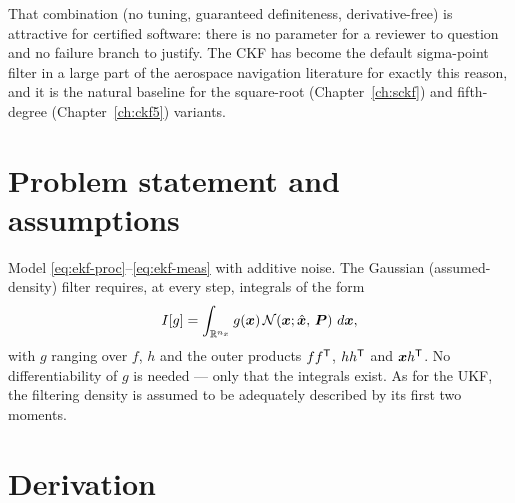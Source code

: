 That combination (no tuning, guaranteed definiteness, derivative-free) is attractive for
certified software: there is no parameter for a reviewer to question and no failure branch to
justify. The CKF has become the default sigma-point filter in a large part of the aerospace
navigation literature for exactly this reason, and it is the natural baseline for the
square-root (Chapter~\ref{ch:sckf}) and fifth-degree (Chapter~\ref{ch:ckf5}) variants.

\section{Problem statement and assumptions}
Model \eqref{eq:ekf-proc}--\eqref{eq:ekf-meas} with additive noise. The Gaussian
(assumed-density) filter requires, at every step, integrals of the form
\begin{equation}
I[g] = \int_{\mathbb{R}^{n_x}} g(\bm{x})\, \mathcal{N}\!\left(\bm{x};\hat{\bm{x}},\,\bm{P}\right)\, d\bm{x},
\label{eq:ckf-integral}
\end{equation}
with $g$ ranging over $f$, $h$ and the outer products $ff^{\mathsf{T}}$, $hh^{\mathsf{T}}$ and $\bm{x} h^{\mathsf{T}}$. No
differentiability of $g$ is needed --- only that the integrals exist. As for the UKF, the
filtering density is assumed to be adequately described by its first two moments.

\section{Derivation}
